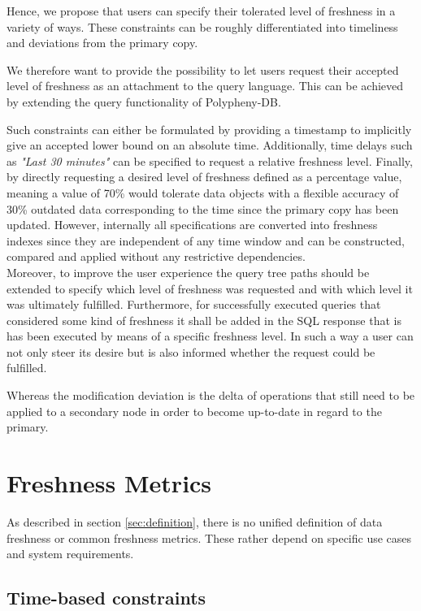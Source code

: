 Hence, we propose that users can specify their tolerated level of freshness in a variety of ways. These constraints can be roughly differentiated into
timeliness and deviations from the primary copy. 

We therefore want to provide the possibility to let users request their accepted level of freshness as an attachment to the query language. 
This can be achieved by extending the query functionality of Polypheny-DB.

Such constraints can either be formulated by providing a timestamp to implicitly give an accepted lower bound on an absolute time.
Additionally, time delays such as \textit{"Last 30 minutes"} can be specified to request a relative freshness level.
Finally, by directly requesting a desired level of freshness defined as a percentage value, meaning a value of 70\% would tolerate data objects
with a flexible accuracy of 30\% outdated data corresponding to the time since the primary copy has been updated.
However, internally all specifications are converted into freshness indexes since they are independent of any time window and can be constructed, compared and applied 
without any restrictive dependencies.\\

Moreover, to improve the user experience the query tree paths should be extended to specify which level of freshness was requested and with which level it was 
ultimately fulfilled. Furthermore, for successfully executed queries that considered some kind of freshness it shall be added in the SQL response that is has been 
executed by means of a specific freshness level.
In such a way a user can not only steer its desire but is also informed whether the request could be fulfilled.

Whereas the modification deviation is the delta of operations that still need to be applied to a secondary node in order to become up-to-date in regard to the primary. 






\section{Freshness Metrics}
\label{sec:metric}



As described in section \ref{sec:definition}, there is no unified definition of data freshness or common freshness metrics.
These rather depend on specific use cases and system requirements.
\tocless\subsection{Time-based constraints}
